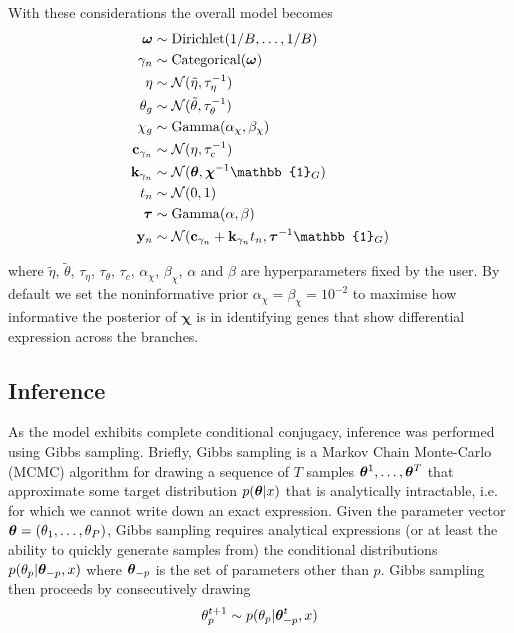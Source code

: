 With these considerations the overall model becomes
\begin{equation} \label{eq:mfamodel}
\begin{aligned}
\bm \omega & \sim \text{Dirichlet}(1 / B, \ldots, 1 / B) \\
\gamma_n & \sim \text{Categorical}(\bm \omega) \\
\eta & \sim \norm(\tilde{\eta}, \tau_\eta^{-1}) \\
\theta_g & \sim \norm(\tilde{\theta}, \tau_\theta^{-1}) \\
\chi_g & \sim \mathrm{Gamma}(\alpha_\chi, \beta_\chi) \\
\cgi & \sim \norm(\eta, \tau_c^{-1}) \\
\kgi & \sim \norm(\bm \theta, \bm \chi^{-1} \mathbb{1}_G) \\
t_n & \sim \norm(0, 1) \\
\btau & \sim \mathrm{Gamma}(\alpha, \beta) \\
\by_n & \sim \norm(\cgi + \kgi t_n, \btau^{-1} \mathbb{1}_G)
\end{aligned}
\end{equation}

where $\tilde{\eta}$, $\tilde{\theta}$, $\tau_\eta$, $\tau_\theta$, $\tau_c$, $\alpha_\chi$, $\beta_\chi$, $\alpha$ and $\beta$ are hyperparameters fixed by the user. By default we set the noninformative prior $\alpha_\chi = \beta_\chi = 10^{-2}$ to maximise how informative the posterior of $\bm \chi$ is in identifying genes that show differential expression across the branches.

\subsection{Inference} \label{sec:gibbs}

As the model exhibits complete conditional conjugacy, inference was performed using Gibbs sampling. Briefly, Gibbs sampling is a Markov Chain Monte-Carlo (MCMC) algorithm for drawing a sequence of $T$ samples ${\bm \theta}^1, \ldots, \bm \theta^T$ that approximate some target distribution $p({\bm \theta} | x)$ that is analytically intractable, i.e. for which we cannot write down an exact expression. Given the parameter vector ${\bm \theta} = (\theta_1, \ldots, \theta_P)$, Gibbs sampling requires analytical expressions (or at least the ability to quickly generate samples from) the conditional distributions $p(\theta_p | {\bm \theta}_{-p}, x)$ where ${\bm \theta}_{-p}$ is the set of parameters other than $p$. Gibbs sampling then proceeds by consecutively drawing
\begin{equation}
		\theta_p^{t+1}  \sim p(\theta_p | {\bm \theta}^t_{-p}, x)
\end{equation}

